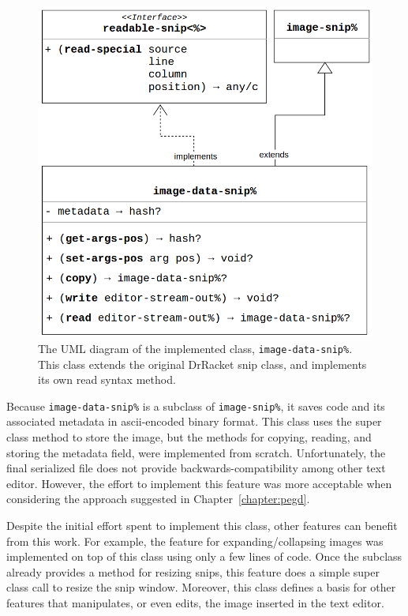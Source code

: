\begin{figure}[!h]
    \centering
    \includegraphics[scale=0.25]{images/img-data-snip}
    \caption{The UML diagram of the implemented class, \texttt{image-data-snip\%}. This class extends the original DrRacket snip class, and implements its own read syntax method.}
    \label{fig:img-data-snip}
\end{figure}

Because \texttt{image-data-snip\%} is a subclass of \texttt{image-snip\%}, it saves code and its associated metadata in ascii-encoded binary format. This class uses the super class method to store the image, but the methods for copying, reading, and storing the metadata field, were implemented from scratch. Unfortunately, the final serialized file does not provide backwards-compatibility among other text editor. However, the effort to implement this feature was more acceptable when considering the approach suggested in Chapter~\ref{chapter:pegd}.

Despite the initial effort spent to implement this class, other features can benefit from this work. For example, the feature for expanding/collapsing images was implemented on top of this class using only a few lines of code. Once the subclass already provides a method for resizing snips, this feature does a simple super class call to resize the snip window. Moreover, this class defines a basis for other features that manipulates, or even edits, the image inserted in the text editor. 

